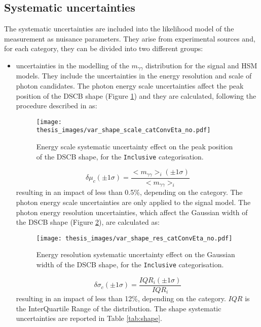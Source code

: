 \documentclass[a4paper, oneside, 11pt, openright]{book}
\begin{document}
 			
 			
 			\subsection{Systematic uncertainties}\label{section:syst}
 				The systematic uncertainties are included into the likelihood model of the measurement as nuisance parameters. They arise from experimental sources and, for each category, they can be divided into two different groups: 
 				\begin{itemize}
 					\item uncertainties in the modelling of the $m_{\gamma\gamma}$ distribution for the signal and HSM models. They include the uncertainties in the energy resolution and scale of photon candidates. The photon energy scale uncertainties affect the peak position of the DSCB shape (Figure \ref{fig:scale_syst}) and they are calculated, following the procedure described in \cite{Aad_2019} as:
 					\begin{figure}
 						\centering
 						\texttt{[image: thesis\_images/var\_shape\_scale\_catConvEta\_no.pdf]}
 						\caption{Energy scale systematic uncertainty effect on the peak position of the DSCB shape, for the \texttt{Inclusive} categorisation.}
 						\label{fig:scale_syst}
 					\end{figure}
 					\begin{equation}\label{eq:shape_syst}
 						\delta\mu_c(\pm1\sigma)=\frac{<m_{\gamma\gamma}>_i(\pm1\sigma)}{<m_{\gamma\gamma}>_i}
 					\end{equation}
 					resulting in an impact of less than 0.5\%, depending on the category. The photon energy scale uncertainties are only applied to the signal model. The photon energy resolution uncertainties, which affect the Gaussian width of the DSCB shape (Figure \ref{fig:res_syst}), are calculated \cite{Aad_2019} as:
 					\begin{figure}
 						\centering
 						\texttt{[image: thesis\_images/var\_shape\_res\_catConvEta\_no.pdf]}
 						\caption{Energy resolution systematic uncertainty effect on the Gaussian width of the DSCB shape, for the \texttt{Inclusive} categorisation.}
 						\label{fig:res_syst}
 					\end{figure}
 					\begin{equation}\label{eq:res_syst}
 						\delta\sigma_c(\pm1\sigma)=\frac{IQR_i(\pm1\sigma)}{IQR_i}
 					\end{equation}
 					resulting in an impact of less than 12\%, depending on the category. $IQR$ is the InterQuartile Range of the distribution. The shape systematic uncertainties are reported in Table \ref{tab:shape}.

\end{itemize}
\end{document}
